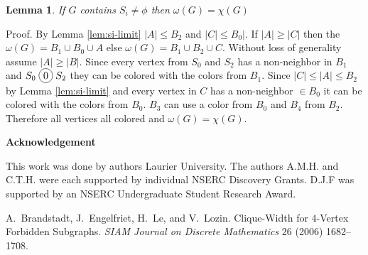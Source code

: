 \documentclass[12pt]{article}
\newcommand*\circled[1]{\tikz[baseline=(char.base)]{
            \node[shape=circle,draw,inner sep=2pt] (char) {#1};}}
\newtheorem{Lemma}[Theorem]{Lemma}
\begin{document}
\begin{Lemma}\label{lem:omega-equals-chromatic}
If $G$ contains $S_i \neq \phi$ then $\omega(G) = \chi(G)$
\end{Lemma}
\noindent {\it} Proof. By Lemma \ref{lem:si-limit} $|A| \leq B_2$ and $|C| \leq B_0|$. If $|A| \geq |C|$ then the $\omega(G) = B_1 \cup B_0 \cup A$ else $\omega(G) = B_1 \cup B_2 \cup C$. Without loss of generality assume $|A| \geq |B|$. Since every vertex from $S_0$ and $S_2$ has a non-neighbor in $B_1$ and $S_0 \;\circled{0}\; S_2$ they can be colored with the colors from $B_1$. Since $|C| \leq |A| \leq B_2$ by Lemma \ref{lem:si-limit} and every vertex in $C$ has a non-neighbor $\in B_0$ it can be colored with the colors from $B_0$. $B_3$ can use a color from $B_0$ and $B_4$ from $B_2$. Therefore all vertices all colored and $\omega(G) = \chi(G)$.

\begin{center}
{\bf Acknowledgement}
\end{center}
This work was done by authors  Laurier University. The authors A.M.H. and C.T.H. were each supported by individual NSERC Discovery Grants. D.J.F was supported by an NSERC Undergraduate Student Research Award.


\clearpage
\begin{thebibliography}{99}


    A.~Brandstadt, J.~Engelfriet, H.~Le, and V.~Lozin. Clique-Width for $4$-Vertex Forbidden Subgraphs.  {\sl SIAM
     Journal on Discrete Mathematics} 26 (2006) 1682--1708.

\end{thebibliography}
\end{document}
